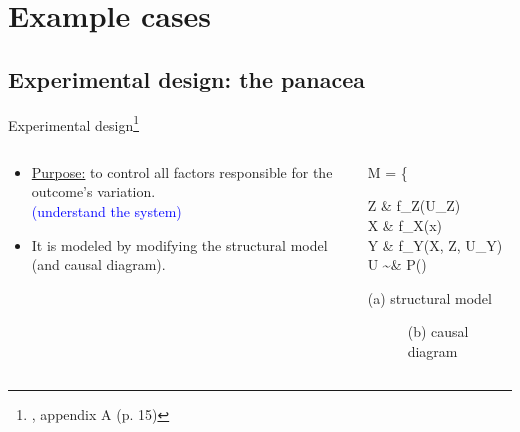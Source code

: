 \section{Example cases}
%
%
\subsection{Experimental design: the panacea}
%
%
\begin{frame}[t, negative]
	\subsectionpage
\end{frame}
%
%
\begin{frame}
	{Experimental design\footnote{\citet{Cinelli_et_al_2021}, appendix A (p. 15)}}
	\begin{columns}
		\begin{column}{0.5\textwidth}
			\begin{itemize}
				\item \underline{Purpose:} to control all factors responsible for the outcome's variation. \\
				{\small \textcolor{blue}{(understand the system)}}
				\item It is modeled by modifying the structural model (and causal diagram).
			\end{itemize}
		\end{column}
		\begin{column}{0.5\textwidth}  
			\begin{equ}
				M = \left\{ \begin{aligned} 
					Z \leftarrow & \; f_{Z}(U_{Z}) \\
					X \leftarrow & \; f_{X}(x) \\
					Y \leftarrow & \; f_{Y}(X, Z, U_{Y}) \\
					U \sim & \; P()
				\end{aligned} \right
				\caption*{(a) structural model}
			\end{equ}
			\begin{figure}
				\caption*{(b) causal diagram}
			\end{figure}
		\end{column}
	\end{columns}
\end{frame}
